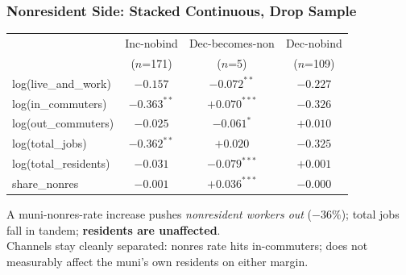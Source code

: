 \documentclass[xcolor = x11names, compress, aspectratio = 169]{beamer}
\begin{document}
    \begin{frame}
    \frametitle{Nonresident Side: Stacked Continuous, Drop Sample}
        \centering
        \scriptsize
        \renewcommand{\arraystretch}{1.15}
        \setlength{\tabcolsep}{8pt}
        \begin{tabular}{lccc}
            \toprule
            & Inc-nobind & Dec-becomes-non & Dec-nobind \\
            & ($n$=171) & ($n$=5) & ($n$=109) \\
            \midrule
            log(live\_and\_work)   & $-0.157$           & $-0.072^{**}$  & $-0.227$ \\
            log(in\_commuters)     & $\bm{-0.363^{**}}$ & $+0.070^{***}$ & $-0.326$ \\
            log(out\_commuters)    & $-0.025$           & $-0.061^{*}$   & $+0.010$ \\
            log(total\_jobs)       & $\bm{-0.362^{**}}$ & $+0.020$       & $-0.325$ \\
            log(total\_residents)  & $-0.031$           & $-0.079^{***}$ & $+0.001$ \\
            share\_nonres          & $-0.001$           & $+0.036^{***}$ & $-0.000$ \\
            \bottomrule
        \end{tabular}
        \vspace{0.10cm}

        \footnotesize
        A muni-nonres-rate increase pushes \emph{nonresident workers out}
        ($-36\%$); total jobs fall in tandem; \textbf{residents are unaffected}.
        \medskip\\
        Channels stay cleanly separated: nonres rate hits in-commuters;
        does not measurably affect the muni's own residents on either margin.
    \end{frame}
\end{document}
